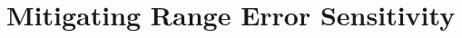 \documentclass[journal]{IEEEtran}
\begin{document}
\section{Mitigating Range Error Sensitivity}
\label{sec_app}

%
%
%
%
%
%
\end{document}
